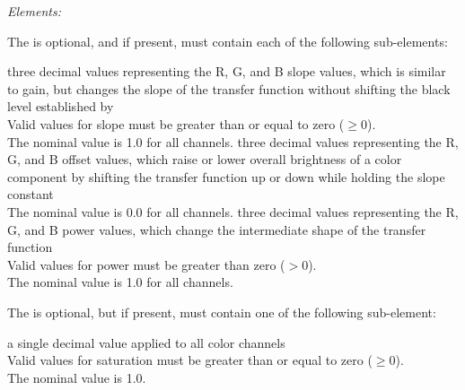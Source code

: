 \emph{Elements:}
\begin{xmlfields}
    \xmlitem[SOPNode][optional] The  is optional, and if present, must contain each of the following sub-elements:
    \begin{xmlfields}
        \xmlitemd[Slope] three decimal values representing the R, G, and B slope values, which 
        is similar to gain, but changes the slope of the transfer function without shifting the black level established by  \\
        Valid values for slope must be greater than or equal to zero ($\geq 0$). \\
        The nominal value is 1.0 for all channels.
        \xmlitemd[Offset] three decimal values representing the R, G, and B offset values, which raise or lower overall brightness of a color component by shifting the transfer function up or down while holding the slope constant \\
        The nominal value is 0.0 for all channels.
        \xmlitemd[Power] three decimal values representing the R, G, and B power values, which change the intermediate shape of the transfer function \\
        Valid values for power must be greater than zero ($> 0$). \\
        The nominal value is 1.0 for all channels.
    \end{xmlfields}
    \xmlitem[SatNode][optional] The  is optional, but if present, must contain one of the following sub-element:
    \begin{xmlfields} 
        \xmlitemd[Saturation] a single decimal value applied to all color channels \\
        Valid values for saturation must be greater than or equal to zero ($\geq 0$). \\
        The nominal value is 1.0.
    \end{xmlfields}
\end{xmlfields}




